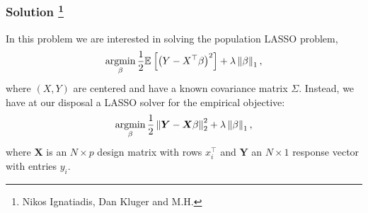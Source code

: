  \subsubsection*{Solution \footnote{Nikos Ignatiadis, Dan Kluger and M.H.}}


 In this problem we are interested in solving the population LASSO problem,
 \begin{equation}
 \label{eq:population_lasso}
 \operatorname*{argmin}_{\beta} \frac{1}{2} \mathbb{E}_{}\left[\left(Y - X^\top \beta\right)^2\right] + \lambda \left\lVert\beta\right\rVert_1,
 \end{equation}
 where $(X,Y)$ are centered and have a known covariance matrix $\Sigma$. Instead, we have at our disposal a LASSO solver for the empirical objective:
 \begin{equation}
 \label{eq:empirical_lasso}
 \operatorname*{argmin}_{\beta} \frac{1}{2} \left\lVert\bm{Y} - \bm{X} \beta\right\rVert^2_2 + \lambda \left\lVert\beta\right\rVert_1,
 \end{equation}
 where $\mathbf{X}$ is an $N \times p$ design matrix with rows $x_i^\top$ and $\mathbf{Y}$ an $N\times 1$ response vector with entries $y_i$.
 
